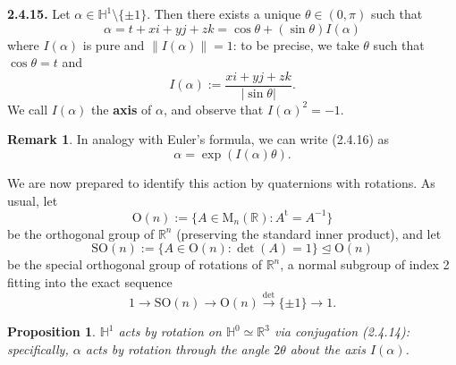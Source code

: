 \documentclass{article}
\newtheorem{proposition}[theorem]{Proposition}
\theoremstyle{definition}
\newtheorem{remark}[theorem]{Remark}
\begin{document}
\textbf{2.4.15.} Let $\alpha \in \mathbb{H}^1 \setminus \{\pm 1\}$. Then there exists a unique $\theta \in (0, \pi)$ such that
\begin{equation}
\alpha = t + xi + yj + zk = \cos \theta + (\sin \theta)I(\alpha) \tag{2.4.16}
\end{equation}
where $I(\alpha)$ is pure and $\|I(\alpha)\| = 1$: to be precise, we take $\theta$ such that $\cos \theta = t$ and
$$I(\alpha) := \frac{xi + yj + zk}{|\sin \theta|}.$$
We call $I(\alpha)$ the \textbf{axis} of $\alpha$, and observe that $I(\alpha)^2 = -1$.

\begin{remark}
In analogy with Euler's formula, we can write (2.4.16) as
$$\alpha = \exp(I(\alpha)\theta).$$
\end{remark}

We are now prepared to identify this action by quaternions with rotations. As usual, let
$$\mathrm{O}(n) := \{A \in \mathrm{M}_n(\mathbb{R}) : A^{\mathrm{t}} = A^{-1}\}$$
be the orthogonal group of $\mathbb{R}^n$ (preserving the standard inner product), and let
$$\mathrm{SO}(n) := \{A \in \mathrm{O}(n) : \det(A) = 1\} \trianglelefteq \mathrm{O}(n)$$
be the special orthogonal group of rotations of $\mathbb{R}^n$, a normal subgroup of index 2 fitting into the exact sequence
$$1 \to \mathrm{SO}(n) \to \mathrm{O}(n) \xrightarrow{\det} \{\pm 1\} \to 1.$$

\begin{proposition}
$\mathbb{H}^1$ acts by rotation on $\mathbb{H}^0 \simeq \mathbb{R}^3$ via conjugation (2.4.14): specifically, $\alpha$ acts by rotation through the angle $2\theta$ about the axis $I(\alpha)$.
\end{proposition}
\end{document}
